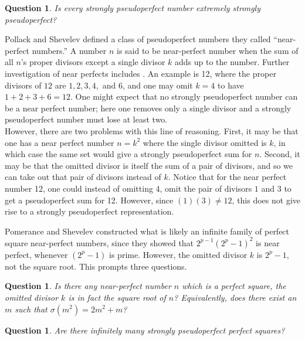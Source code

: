 \documentclass{article}
\newtheorem{question}[theorem]{Question}
\begin{document}
\begin{question} Is every strongly pseudoperfect number extremely strongly pseudoperfect?
\end{question}

Pollack and Shevelev \cite{PollackShev} defined a class of pseudoperfect numbers they called ``near-perfect numbers.''  A number $n$ is said to be near-perfect number when the sum of all $n$'s proper divisors except a single divisor $k$ adds up to the number. Further investigation of near perfects includes \cite{RenChen}. An example is 12, where the proper divisors of $12$ are $1,2,3,4,$ and $6$, and one may omit $k=4$ to have $1+2+3+6=12$. One might expect that no strongly pseudoperfect number can be a near perfect number; here one removes only a single divisor and a strongly pseudoperfect number must lose at least two. \\

However, there are two problems with this line of reasoning. First, it may be that one has a near perfect number $n=k^2$ where the single divisor omitted is $k$, in which case the same set would give a strongly pseudoperfect sum for $n$. Second, it may be that the omitted divisor is itself the sum of a pair of divisors, and so we can take out that pair of divisors instead of $k$. Notice that for the near perfect number 12, one could instead of omitting 4, omit the pair of divisors $1$ and $3$ to get a pseudoperfect sum for 12. However, since $(1)(3) \neq 12$, this does not give rise to a strongly pseudoperfect  representation.

Pomerance and Shevelev constructed what is likely an infinite family of perfect square near-perfect numbers, since they showed that $2^{p-1}(2^p-1)^2$ is near perfect, whenever $(2^p-1)$ is prime. However, the omitted divisor $k$ is $2^p-1$, not the square root. This prompts three questions.

\begin{question} Is there any near-perfect number $n$ which is a perfect square, the omitted divisor $k$ is in fact the square root of $n$? \label{near perfect with perfect square as omitted} Equivalently, does there exist an $m$ such that $\sigma(m^2)=2m^2 +m$?
\end{question}

\begin{question} Are there infinitely many strongly pseudoperfect perfect squares? \label{any strong pseudoperfect perfect square}
\end{question}
\end{document}
